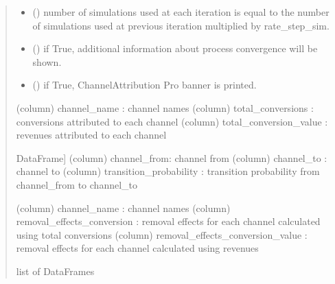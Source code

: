\documentclass[letterpaper,10pt,english]{sphinxmanual}
\begin{document}
\begin{fulllineitems}
\begin{quote}
\begin{description}
\begin{itemize}
\item {} 
\sphinxAtStartPar
{} (\sphinxstyleliteralemphasis{\sphinxupquote{, }}) \textendash{} number of simulations used at each iteration is equal to the number of simulations used at previous iteration multiplied by rate\_step\_sim.

\item {} 
\sphinxAtStartPar
{} (\sphinxstyleliteralemphasis{\sphinxupquote{, }}) \textendash{} if True, additional information about process convergence will be shown.

\item {} 
\sphinxAtStartPar
{} (\sphinxstyleliteralemphasis{\sphinxupquote{, }}) \textendash{} if True, ChannelAttribution Pro banner is printed.

\end{itemize}

\sphinxAtStartPar
\begin{description}
\sphinxAtStartPar
(column) channel\_name : channel names
(column) total\_conversions : conversions attributed to each channel
(column) total\_conversion\_value : revenues attributed to each channel

\sphinxlineitem{transition\_matrix}{[}DataFrame{]}
\sphinxAtStartPar
(column) channel\_from: channel from
(column) channel\_to : channel to
(column) transition\_probability : transition probability from channel\_from to channel\_to

\sphinxAtStartPar
(column) channel\_name : channel names
(column) removal\_effects\_conversion : removal effects for each channel calculated using total conversions
(column) removal\_effects\_conversion\_value : removal effects for each channel calculated using revenues

\end{description}


\sphinxAtStartPar
list of DataFrames

\end{description}\end{quote}

\end{fulllineitems}
\end{document}
